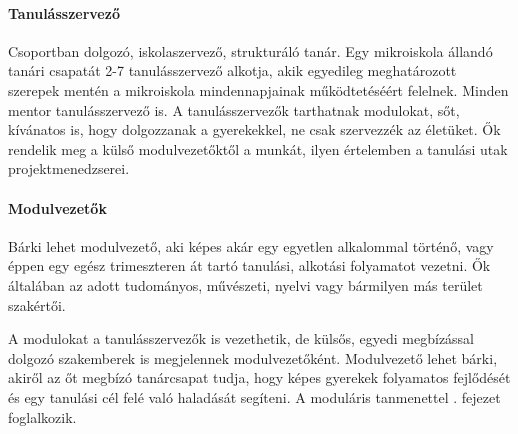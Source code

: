 \paragraph{Tanulásszervező}
Csoportban dolgozó, iskolaszervező, strukturáló tanár. Egy mikroiskola
állandó tanári
csapatát 2-7 tanulásszervező alkotja, akik egyedileg meghatározott szerepek
mentén a mikroiskola mindennapjainak működtetéséért felelnek. Minden mentor
tanulásszervező is. A tanulásszervezők tarthatnak
modulokat, sőt, kívánatos is, hogy dolgozzanak a gyerekekkel, ne csak
szervezzék az életüket.
Ők rendelik meg a külső modulvezetőktől a munkát, ilyen értelemben a
tanulási utak projektmenedzserei.

\paragraph{Modulvezetők}

Bárki lehet modulvezető, aki képes akár egy egyetlen alkalommal történő, vagy
éppen
egy egész trimeszteren át tartó tanulási, alkotási folyamatot vezetni. Ők
általában
az adott tudományos, művészeti, nyelvi vagy bármilyen más terület szakértői.

A modulokat a tanulásszervezők is vezethetik, de külsős, egyedi megbízással
dolgozó szakemberek is megjelennek modulvezetőként. Modulvezető lehet bárki,
akiről az őt megbízó tanárcsapat tudja, hogy képes gyerekek folyamatos
fejlődését és egy tanulási cél felé való haladását segíteni. A moduláris
tanmenettel . fejezet foglalkozik.
